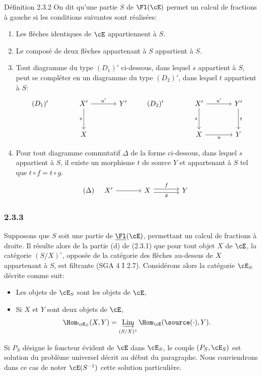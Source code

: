 \begin{statement}{Définition 2.3.2}
On dit qu'une partie $S$ de $\Fl(\cE)$ permet un calcul de fractions à gauche si les conditions suivantes sont réalisées:
\begin{enumerate}[label=(\alph*)]
\item[(a')] Les flèches identiques de $\cE$ appartiennent à $S$.
\item[(b')] Le composé de deux flèches appartenant à $S$ appartient à $S$.
\item[(c')] Tout diagramme du type $(D_1)'$ ci-dessous, dans lequel $s$ appartient à $S$,
peut se compléter en un diagramme du type $(D_2)'$, dans lequel $t$ appartient à $S$:
\[
\begin{tikzcd}[column sep=large,row sep=large]
(D_1)'& X' \arrow[r,"u'"] \arrow[d,"s"'] & Y'\\
& X
\end{tikzcd}
\qquad
\begin{tikzcd}[column sep=large,row sep=large]
(D_2)'& X' \arrow[r,"u'"] \arrow[d,"s"'] & Y' \arrow[d,"t"]\\
& X \arrow[r,"u"'] & Y
\end{tikzcd}
\]
\item[(d)'] Pour tout diagramme commutatif $\Delta$ de la forme ci-dessous, dans lequel $s$ appartient à $S$, il existe un morphisme $t$ de source $Y$ et appartenant à $S$ tel que $t\circ f=t\circ g$.
\[
(\Delta)\quad
\begin{tikzcd}[column sep=large]
X' \arrow[r] & X \arrow[r,shift left,"f"] \arrow[r,shift right,"g"'] & Y
\end{tikzcd}
\]
\end{enumerate}
\end{statement}

\subsubsection*{2.3.3}
Supposons que $S$ soit une partie de $\underline{\Fl}(\cE)$, permettant un calcul de fractions à droite. Il résulte alors de la partie (d) de (2.3.1) que pour tout objet $X$ de $\cE$, la catégorie $(S/X)^\circ$, opposée de la catégorie des flèches au-dessus de $X$ appartenant à $S$, est filtrante (SGA 4 I 2.7). Considérons alors la catégorie $\cE_S$ décrite comme suit:
\begin{itemize}[label=-]
\item Les objets de $\cE_S$ sont les objets de $\cE$,
\item Si $X$ et $Y$ sont deux objets de $\cE$,
\[
\Hom_{\cE_S}(X,Y)=\mathop{\underrightarrow{\mathrm{Lim}}}\limits_{(S/X)^\circ}\Hom_{\cE}(\source(\cdot),Y).
\]
\end{itemize}
Si $P_S$ désigne le foncteur évident de $\cE$ dans $\cE_S$, le couple $(P_S,\cE_S)$ est solution du problème universel décrit au début du paragraphe. Nous conviendrons dans ce cas de noter $\cE(S^{-1})$ cette solution particulière.

